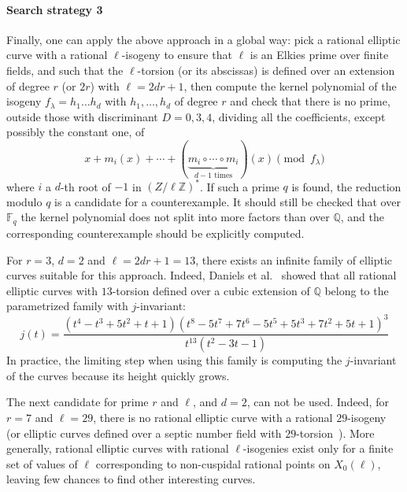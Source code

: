 \documentclass[12pt]{article}
\theoremstyle{plain}
\theoremstyle{definition}
\def\Q{\ensuremath{\mathbb{Q}}}
\def\Z{\ensuremath{\mathbb{Z}}}
\def\F{\ensuremath{\mathbb{F}}}
\begin{document}
\paragraph{Search strategy 3}
Finally, one can apply the above approach in a global way:
pick a rational elliptic curve with a rational $\ell$-isogeny
to ensure that $\ell$ is an Elkies prime over finite fields,
and such that the $\ell$-torsion (or its abscissas) is defined
over an extension of degree $r$ (or $2r$) with $\ell = 2 d r + 1$,
then compute the kernel polynomial of the isogeny
$f_\lambda = h_1 \ldots h_d$ with $h_1, \ldots, h_d$ of degree $r$
and check that there is no prime, outside those with discriminant $D=0,3,4$,
dividing all the coefficients, except possibly the constant one, of
\[
x + m_i(x) + \cdots + (\underbrace{m_i \circ \cdots \circ m_i}_\text{$d-1$ times}) (x) \pmod{f_\lambda}
\]
where $i$ a $d$-th root of $-1$ in $\left(Z / \ell \Z\right)^*$.
If such a prime $q$ is found, the reduction modulo $q$ is a
candidate for a counterexample.
It should still be checked that over $\F_q$ the kernel polynomial
does not split into more factors than over $\Q$,
and the corresponding counterexample should be explicitly computed.

For $r = 3$, $d = 2$ and $\ell = 2 d r + 1 = 13$, there exists an
infinite family of elliptic curves suitable for this approach.
Indeed, Daniels et al.~\cite{daniels_torsion_2015} showed that
all rational elliptic curves with $13$-torsion defined over a cubic extension
of $\Q$ belong to the parametrized family with $j$-invariant:
\[
j(t)=\frac{\left(t^4-t^3+5 t^2 + t + 1\right) \left(t^8 - 5 t^7 + 7 t^6 - 5 t^5 + 5 t^3 + 7 t^2 + 5 t + 1\right)^3}{t^{13} \left(t^2 -3 t - 1\right)}
\]
In practice, the limiting step when using this family is computing
the $j$-invariant of the curves because its height quickly grows.

The next candidate for prime $r$ and $\ell$, and $d = 2$, can not be used.
Indeed, for $r = 7$ and $\ell = 29$, there is no rational elliptic curve
with a rational $29$-isogeny~\cite{Mazur1974} (or elliptic curves defined
over a septic number field with $29$-torsion~\cite{Derickx201452}).
More generally, rational elliptic curves with rational $\ell$-isogenies
exist only for a finite set of values of $\ell$ corresponding
to non-cuspidal rational points on $X_0(\ell)$, leaving few chances
to find other interesting curves.
\end{document}
